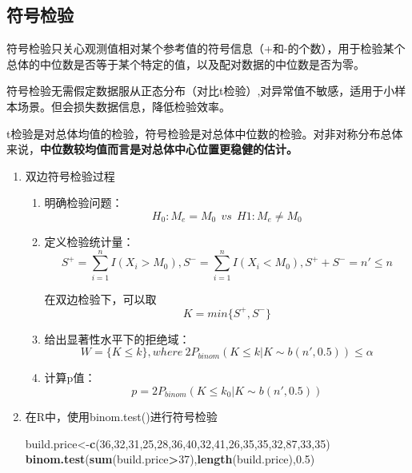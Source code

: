 \documentclass[
]{book}
\newenvironment{Shaded}{\begin{snugshade}}{\end{snugshade}}
\newcommand{\DecValTok}[1]{\textcolor[rgb]{0.00,0.00,0.81}{#1}}
\newcommand{\FloatTok}[1]{\textcolor[rgb]{0.00,0.00,0.81}{#1}}
\newcommand{\FunctionTok}[1]{\textcolor[rgb]{0.13,0.29,0.53}{\textbf{#1}}}
\newcommand{\NormalTok}[1]{#1}
\newcommand{\OtherTok}[1]{\textcolor[rgb]{0.56,0.35,0.01}{#1}}
\newcommand{\SpecialCharTok}[1]{\textcolor[rgb]{0.81,0.36,0.00}{\textbf{#1}}}
\begin{document}
\subsection{符号检验}\label{ux7b26ux53f7ux68c0ux9a8c}

符号检验只关心观测值相对某个参考值的符号信息（+和-的个数），用于检验某个总体的中位数是否等于某个特定的值，以及配对数据的中位数是否为零。

符号检验无需假定数据服从正态分布（对比t检验）,对异常值不敏感，适用于小样本场景。但会损失数据信息，降低检验效率。

t检验是对总体均值的检验，符号检验是对总体中位数的检验。对非对称分布总体来说，\textbf{中位数较均值而言是对总体中心位置更稳健的估计。}

\begin{enumerate}
\def\labelenumi{\arabic{enumi}.}
\item
  双边符号检验过程

  \begin{enumerate}
  \def\labelenumii{\arabic{enumii}.}
  \item
    明确检验问题：\[
    H_0:M_e=M_0\ \ vs\ \ H1:M_e\neq M_0
    \]
  \item
    定义检验统计量：\[
    S^+ = \sum_{i=1}^nI(X_i>M_0),S^-=\sum_{i=1}^nI(X_i<M_0),S^++S^-=n'\leq n 
    \]

    在双边检验下，可以取\[
    K=min\{S^+,S^-\}
    \]
  \item
    给出显著性水平下的拒绝域：\[
    W = \{K\leq k\},where\ 2P_{binom}(K\leq k|K\sim b(n',0.5))\leq \alpha
    \]
  \item
    计算p值：\[
    p = 2P_{binom}(K\leq k_0|K\sim b(n',0.5))
    \]
  \end{enumerate}
\item
  在R中，使用binom.test()进行符号检验

\begin{Shaded}
\begin{Highlighting}[]
\NormalTok{build.price}\OtherTok{\textless{}{-}}\FunctionTok{c}\NormalTok{(}\DecValTok{36}\NormalTok{,}\DecValTok{32}\NormalTok{,}\DecValTok{31}\NormalTok{,}\DecValTok{25}\NormalTok{,}\DecValTok{28}\NormalTok{,}\DecValTok{36}\NormalTok{,}\DecValTok{40}\NormalTok{,}\DecValTok{32}\NormalTok{,}\DecValTok{41}\NormalTok{,}\DecValTok{26}\NormalTok{,}\DecValTok{35}\NormalTok{,}\DecValTok{35}\NormalTok{,}\DecValTok{32}\NormalTok{,}\DecValTok{87}\NormalTok{,}\DecValTok{33}\NormalTok{,}\DecValTok{35}\NormalTok{)}
\FunctionTok{binom.test}\NormalTok{(}\FunctionTok{sum}\NormalTok{(build.price}\SpecialCharTok{\textgreater{}}\DecValTok{37}\NormalTok{),}\FunctionTok{length}\NormalTok{(build.price),}\FloatTok{0.5}\NormalTok{)}
\end{Highlighting}
\end{Shaded}


\end{enumerate}
\end{document}
